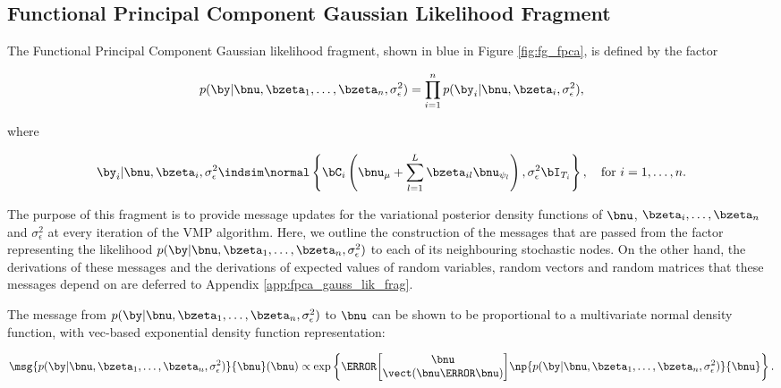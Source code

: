 \documentclass[12pt]{article}
\def\sigsqeps{\sigma^2_{\epsilon}}
\def\numu{\bnu_\mu}
\newcommand\nupsi[1]{\bnu_{\psi_{#1}}}
\theoremstyle{plain}
\theoremstyle{definition}
\theoremstyle{remark}
\begin{document}

\subsection{Functional Principal Component Gaussian Likelihood Fragment}
\label{sec:fpca_gauss_lik_frag}

The Functional Principal Component Gaussian likelihood fragment, shown in blue in Figure
\ref{fig:fg_fpca}, is defined by the factor

\begin{equation}
	p (\by | \bnu, \bzeta_1, \dots, \bzeta_n, \sigsqeps) =
		\prod_{i=1}^n p (\by_i | \bnu, \bzeta_i, \sigsqeps),
\label{fpc_gauss_lik_factorized}
\end{equation}

\noindent where

\begin{equation}
	\by_i | \bnu, \bzeta_i, \sigsqeps \indsim \normal \left\{
		\bC_i \left( \numu + \sum_{l=1}^L \bzeta_{il} \nupsi{l} \right), \sigsqeps \bI_{T_i}
	\right\}, \quad \text{for $i = 1, \dots, n$}.
\label{fpc_gauss_lik_factor}
\end{equation}

\noindent The purpose of this fragment is to provide message updates for the variational posterior density functions
of $\bnu$, $\bzeta_i, \dots, \bzeta_n$ and $\sigsqeps$ at every iteration of the VMP algorithm.
Here, we outline the construction of the messages that are passed from the factor representing
the likelihood $p (\by | \bnu, \bzeta_1, \dots, \bzeta_n, \sigsqeps)$ to each of its neighbouring stochastic nodes.
On the other hand, the
derivations of these messages and the derivations of expected values of random variables, random vectors
and random matrices that these messages depend on are deferred to Appendix \ref{app:fpca_gauss_lik_frag}.

The message from $p (\by | \bnu, \bzeta_1, \dots, \bzeta_n, \sigsqeps)$ to $\bnu$ can be shown to be
proportional to a multivariate
normal density function, with vec-based exponential density function representation:

\begin{equation}
	\msg{p (\by | \bnu, \bzeta_1, \dots, \bzeta_n, \sigsqeps)}{\bnu} (\bnu) \propto
		\exp \left\{
			\T{\begin{bmatrix}
				\bnu \\
				\vect (\bnu \T{\bnu})
			\end{bmatrix}}
			\np{p (\by | \bnu, \bzeta_1, \dots, \bzeta_n, \sigsqeps)}{\bnu}
		\right\}.
\label{msg_lik_nu}
\end{equation}
\end{document}
